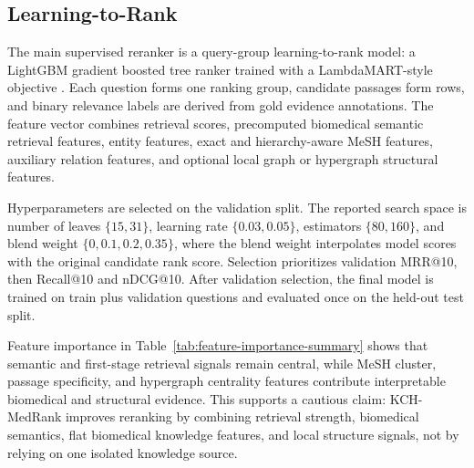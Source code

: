 \subsection{Learning-to-Rank}

The main supervised reranker is a query-group learning-to-rank model: a LightGBM gradient boosted tree ranker trained with a LambdaMART-style objective \citep{ke2017lightgbm}. Each question forms one ranking group, candidate passages form rows, and binary relevance labels are derived from gold evidence annotations. The feature vector combines retrieval scores, precomputed biomedical semantic retrieval features, entity features, exact and hierarchy-aware MeSH features, auxiliary relation features, and optional local graph or hypergraph structural features.

Hyperparameters are selected on the validation split. The reported search space is number of leaves $\{15,31\}$, learning rate $\{0.03,0.05\}$, estimators $\{80,160\}$, and blend weight $\{0,0.1,0.2,0.35\}$, where the blend weight interpolates model scores with the original candidate rank score. Selection prioritizes validation MRR@10, then Recall@10 and nDCG@10. After validation selection, the final model is trained on train plus validation questions and evaluated once on the held-out test split.



Feature importance in Table~\ref{tab:feature-importance-summary} shows that semantic and first-stage retrieval signals remain central, while MeSH cluster, passage specificity, and hypergraph centrality features contribute interpretable biomedical and structural evidence. This supports a cautious claim: KCH-MedRank improves reranking by combining retrieval strength, biomedical semantics, flat biomedical knowledge features, and local structure signals, not by relying on one isolated knowledge source.
